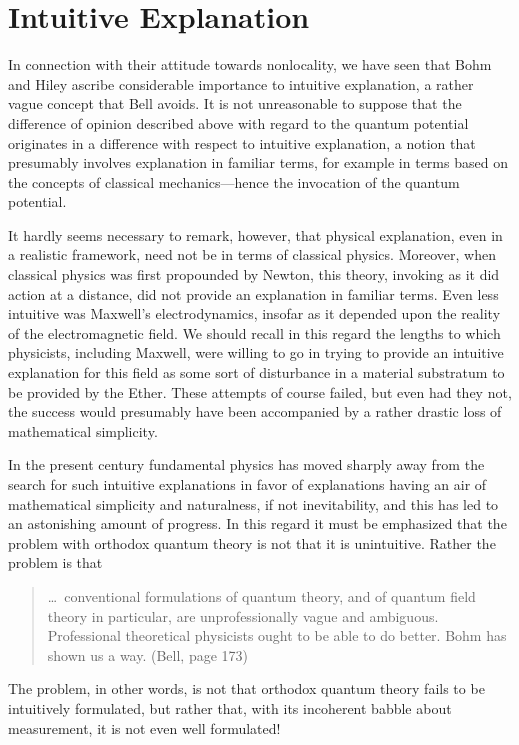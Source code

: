 \documentclass[12pt]{article}
\newcommand\bq{\begin{quotation}}
\newcommand\eq{\end{quotation}}
\begin{document}
\section*{Intuitive Explanation}

In connection with their attitude towards nonlocality, we have seen that
Bohm and Hiley ascribe considerable importance to intuitive explanation, a
rather vague concept that Bell avoids. It is not unreasonable to suppose
that the difference of opinion described above with regard to the quantum
potential originates in a difference with respect to intuitive
explanation, a notion that presumably involves explanation in familiar
terms, for example in terms based on the concepts of classical
mechanics---hence the invocation of the quantum potential.

It hardly seems necessary to remark, however, that physical explanation,
even in a realistic framework, need not be in terms of classical physics.
Moreover, when classical physics was first propounded by Newton, this
theory, invoking as it did action at a distance, did not provide an
explanation in familiar terms. Even less intuitive was Maxwell's
electrodynamics, insofar as it depended upon the reality of the
electromagnetic field. We should recall in this regard the lengths to which
physicists, including Maxwell, were willing to go in trying to provide an
intuitive explanation for this field as some sort of disturbance in a
material substratum to be provided by the Ether. These attempts of course
failed, but even had they not, the success would presumably have been
accompanied by a rather drastic loss of mathematical simplicity.

In the present century fundamental physics has moved sharply away from the
search for such intuitive explanations in favor of explanations having an
air of mathematical simplicity and naturalness, if not inevitability, and
this has led to an astonishing amount of progress. In this regard it must
be emphasized that the problem with orthodox quantum theory is not that it
is unintuitive. Rather the problem is that

\bq \noindent \dots\  conventional formulations of quantum theory, and of
quantum field theory in particular, are unprofessionally vague and
ambiguous. Professional theoretical physicists ought to be able to do
better. Bohm has shown us a way. (Bell, page 173)
\eq
The problem, in other words, is not that orthodox quantum theory fails to be
intuitively formulated, but rather that, with its incoherent babble about
measurement,  it  is not even  well formulated!
\end{document}
